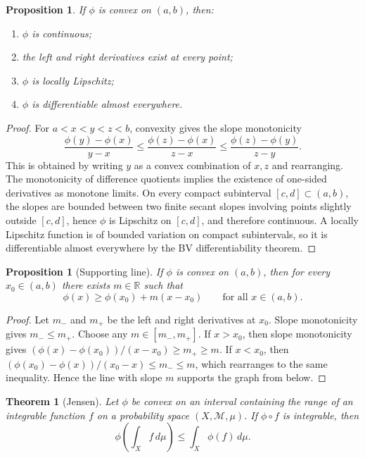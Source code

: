 \documentclass[11pt,openany]{book}
\numberwithin{equation}{chapter}
\theoremstyle{definition}
\theoremstyle{plain}
\newtheorem{theorem}[definition]{Theorem}
\newtheorem{proposition}[definition]{Proposition}
\theoremstyle{remark}
\newcommand{\R}{\mathbb{R}}
\newcommand{\M}{\mathcal{M}}
\newcommand{\1}{\mathbf{1}}
\newcommand{\dd}{\,d}
\begin{document}
\begin{proposition}
If \(\phi\) is convex on \((a,b)\), then:
\begin{enumerate}[label=(\roman*)]
    \item \(\phi\) is continuous;
    \item the left and right derivatives exist at every point;
    \item \(\phi\) is locally Lipschitz;
    \item \(\phi\) is differentiable almost everywhere.
\end{enumerate}
\end{proposition}

\begin{proof}
For \(a<x<y<z<b\), convexity gives the slope monotonicity
\[
    \frac{\phi(y)-\phi(x)}{y-x}
    \le \frac{\phi(z)-\phi(x)}{z-x}
    \le \frac{\phi(z)-\phi(y)}{z-y}.
\]
This is obtained by writing \(y\) as a convex combination of \(x,z\) and rearranging.  The monotonicity of difference quotients implies the existence of one-sided derivatives as monotone limits.  On every compact subinterval \([c,d]\subset(a,b)\), the slopes are bounded between two finite secant slopes involving points slightly outside \([c,d]\), hence \(\phi\) is Lipschitz on \([c,d]\), and therefore continuous.  A locally Lipschitz function is of bounded variation on compact subintervals, so it is differentiable almost everywhere by the BV differentiability theorem.
\end{proof}

\begin{proposition}[Supporting line]
If \(\phi\) is convex on \((a,b)\), then for every \(x_0\in(a,b)\) there exists \(m\in\R\) such that
\[
    \phi(x)\ge \phi(x_0)+m(x-x_0)
    \qquad\text{for all }x\in(a,b).
\]
\end{proposition}

\begin{proof}
Let \(m_-\) and \(m_+\) be the left and right derivatives at \(x_0\).  Slope monotonicity gives \(m_-\le m_+\).  Choose any \(m\in[m_-,m_+]\).  If \(x>x_0\), then slope monotonicity gives \((\phi(x)-\phi(x_0))/(x-x_0)\ge m_+\ge m\).  If \(x<x_0\), then \((\phi(x_0)-\phi(x))/(x_0-x)\le m_-\le m\), which rearranges to the same inequality.  Hence the line with slope \(m\) supports the graph from below.
\end{proof}

\begin{theorem}[Jensen]
Let \(\phi\) be convex on an interval containing the range of an integrable function \(f\) on a probability space \((X,\M,\mu)\).  If \(\phi\circ f\) is integrable, then
\[
    \phi\left(\int_X f\dd\mu\right)\le \int_X\phi(f)\dd\mu.
\]
\end{theorem}
\end{document}
